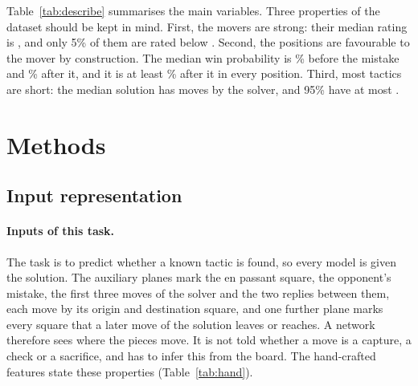 \documentclass[11pt]{article}
\begin{document}
\begin{table}[htbp]\centering\small
{}
\caption{Dataset statistics by split.}
\label{tab:data}
\end{table}

\iflook
Table~\ref{tab:describe} summarises the main variables. Three properties of
the dataset should be kept in mind. First, the movers are strong: their
median rating is , and only 5\% of them are rated
below . Second, the positions are favourable to the
mover by construction. The median win probability is
\% before the mistake and
\% after it, and it is at least
\% after it in every position. Third, most
tactics are short: the median solution has 
moves by the solver, and 95\% have at most .

\begin{table}[htbp]\centering\small
{}
\caption{Summary statistics of selected variables over the whole dataset:
the mean, five quantiles, the minimum and the maximum. The puzzle's rating
and the time spent on the move are not inputs of the models of the fixed
sequence.}
\label{tab:describe}
\end{table}
\fi

\section{Methods}
\label{sec:methods}

\subsection{Input representation}
\label{sec:input}



\paragraph{Inputs of this task.}
The task is to predict whether a known tactic is found, so every model is
given the solution. The auxiliary planes mark the en passant square, the
opponent's mistake, the first three moves of the solver and the two replies
between them, each move by its origin and destination square, and one further
plane marks every square that a later move of the solution leaves or reaches.
A network therefore sees where the pieces move. It is not told whether a move
is a capture, a check or a sacrifice, and has to infer this from the board.
The hand-crafted features state these properties (Table~\ref{tab:hand}).
\end{document}
